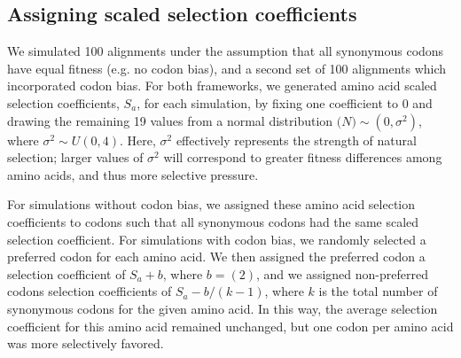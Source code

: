 \documentclass[11pt]{article}
\begin{document}
\subsection*{Assigning scaled selection coefficients}

We simulated 100 alignments under the assumption that all synonymous codons have equal fitness (e.g. no codon bias), and a second set of 100 alignments which incorporated codon bias. For both frameworks, we generated amino acid scaled selection coefficients, $S_a$, for each simulation, by fixing one coefficient to 0 and drawing the remaining 19 values from a normal distribution $\mathcal(N)\sim(0,\sigma^2)$, where $\sigma^2 \sim U(0,4)$. Here, $\sigma^2$ effectively represents the strength of natural selection; larger values of $\sigma^2$ will correspond to greater fitness differences among amino acids, and thus more selective pressure.


For simulations without codon bias, we assigned these amino acid selection coefficients to codons such that all synonymous codons had the same scaled selection coefficient. For simulations with codon bias, we randomly selected a preferred codon for each amino acid. We then assigned the preferred codon a selection coefficient of $S_a + b$, where $b=(2)$, and we assigned non-preferred codons selection coefficients of $S_a - b/(k-1)$, where $k$ is the total number of synonymous codons for the given amino acid. In this way, the average selection coefficient for this amino acid remained unchanged, but one codon per amino acid was more selectively favored.
\end{document}
